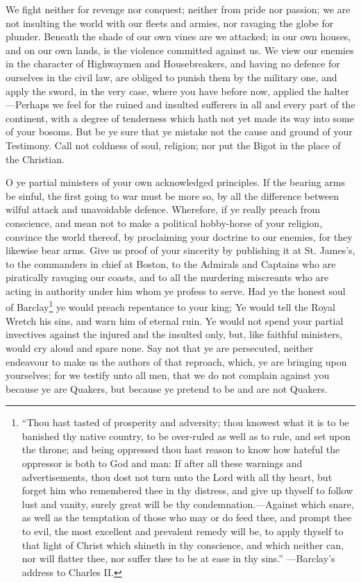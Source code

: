 \documentclass[12pt,oneside]{memoir}
\begin{document}
We fight neither for revenge nor conquest; neither from pride nor passion; we are not insulting the world with our fleets and armies, nor ravaging the globe for plunder. Beneath the shade of our own vines are we attacked; in our own houses, and on our own lands, is the violence committed against us. We view our enemies in the character of Highwaymen and Housebreakers, and having no defence for ourselves in the civil law, are obliged to punish them by the military one, and apply the sword, in the very case, where you have before now, applied the halter---Perhaps we feel for the ruined and insulted sufferers in all and every part of the continent, with a degree of tenderness which hath not yet made its way into some of your bosoms. But be ye sure that ye mistake not the cause and ground of your Testimony. Call not coldness of soul, religion; nor put the Bigot in the place of the Christian.

O ye partial ministers of your own acknowledged principles. If the bearing arms be sinful, the first going to war must be more so, by all the difference between wilful attack and unavoidable defence. Wherefore, if ye really preach from conscience, and mean not to make a political hobby-horse of your religion, convince the world thereof, by proclaiming your doctrine to our enemies, for they likewise bear arms. Give us proof of your sincerity by publishing it at St. James's, to the commanders in chief at Boston, to the Admirals and Captains who are piratically ravaging our coasts, and to all the murdering miscreants who are acting in authority under him whom ye profess to serve. Had ye the honest soul of Barclay\footnote{``Thou hast tasted of prosperity and adversity; thou knowest what it is to be banished thy native country, to be over-ruled as well as to rule, and set upon the throne; and being oppressed thou hast reason to know how hateful the oppressor is both to God and man: If after all these warnings and advertisements, thou dost not turn unto the Lord with all thy heart, but forget him who remembered thee in thy distress, and give up thyself to follow lust and vanity, surely great will be thy condemnation.---Against which snare, as well as the temptation of those who may or do feed thee, and prompt thee to evil, the most excellent and prevalent remedy will be, to apply thyself to that light of Christ which shineth in thy conscience, and which neither can, nor will flatter thee, nor suffer thee to be at ease in thy sins.'' ---Barclay's address to Charles II.} ye would preach repentance to your king; Ye would tell the Royal Wretch his sins, and warn him of eternal ruin. Ye would not spend your partial invectives against the injured and the insulted only, but, like faithful ministers, would cry aloud and spare none. Say not that ye are persecuted, neither endeavour to make us the authors of that reproach, which, ye are bringing upon yourselves; for we testify unto all men, that we do not complain against you because ye are Quakers, but because ye pretend to be and are not Quakers.
\end{document}
